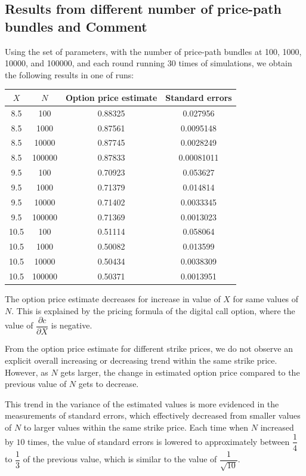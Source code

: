 \subsection{Results from different number of price-path bundles and Comment}

Using the set of parameters, with the number of price-path bundles at 100, 1000, 10000, and 100000, and each round running 30 times of simulations, we obtain the following results in one of runs:

\begin{center}
	\begin{tabular}{| c | c | c | c |}
		\hline $X$ & $N$ & Option price estimate & Standard errors\\
		[0.5ex]
		\hline 8.5 & 100 & 0.88325 & 0.027956\\
		\hline 8.5 & 1000 & 0.87561 & 0.0095148\\
		\hline 8.5 & 10000 & 0.87745 & 0.0028249\\
		\hline 8.5 & 100000 & 0.87833 & 0.00081011\\
		\hline
		\hline 9.5 & 100 & 0.70923 & 0.053627\\
		\hline 9.5 & 1000 & 0.71379 & 0.014814\\
		\hline 9.5 & 10000 & 0.71402 & 0.0033345\\
		\hline 9.5 & 100000 & 0.71369 & 0.0013023\\
		\hline
		\hline 10.5 & 100 & 0.51114 & 0.058064\\
		\hline 10.5 & 1000 & 0.50082 & 0.013599\\
		\hline 10.5 & 10000 & 0.50434 & 0.0038309\\
		\hline 10.5 & 100000 & 0.50371 & 0.0013951\\
		\hline
	\end{tabular}
\end{center}

The option price estimate decreases for increase in value of $X$ for same values of $N$. This is explained by the pricing formula of the digital call option, where the value of $\dfrac{\partial c}{\partial X}$ is negative.

From the option price estimate for different strike prices, we do not observe an explicit overall increasing or decreasing trend within the same strike price. However, as $N$ gets larger, the change in estimated option price compared to the previous value of $N$ gets to decrease. 

This trend in the variance of the estimated values is more evidenced in the measurements of standard errors, which effectively decreased from smaller values of $N$ to larger values within the same strike price. Each time when $N$ increased by $10$ times, the value of standard errors is lowered to approximately between $\dfrac{1}{4}$ to $\dfrac{1}{3}$ of the previous value, which is similar to the value of $\dfrac{1}{\sqrt{10}}$.


